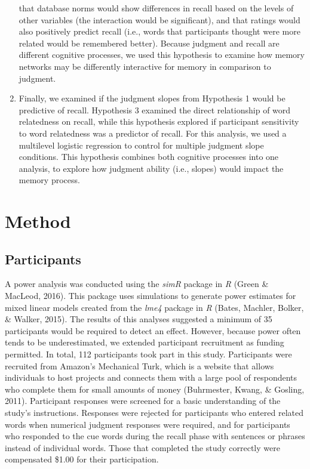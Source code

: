 \documentclass[english,man]{apa6}
\theoremstyle{definition}
\theoremstyle{definition}
\theoremstyle{definition}
\theoremstyle{remark}
\begin{document}
\begin{enumerate}
  that database norms would show differences in recall based on the
  levels of other variables (the interaction would be significant), and
  that ratings would also positively predict recall (i.e., words that
  participants thought were more related would be remembered better).
  Because judgment and recall are different cognitive processes, we used
  this hypothesis to examine how memory networks may be differently
  interactive for memory in comparison to judgment.
\item
  Finally, we examined if the judgment slopes from Hypothesis 1 would be
  predictive of recall. Hypothesis 3 examined the direct relationship of
  word relatedness on recall, while this hypothesis explored if
  participant sensitivity to word relatedness was a predictor of recall.
  For this analysis, we used a multilevel logistic regression to control
  for multiple judgment slope conditions. This hypothesis combines both
  cognitive processes into one analysis, to explore how judgment ability
  (i.e., slopes) would impact the memory process.
\end{enumerate}

\section{Method}\label{method}

\subsection{Participants}\label{participants}

A power analysis was conducted using the \emph{simR} package in \emph{R}
(Green \& MacLeod, 2016). This package uses simulations to generate
power estimates for mixed linear models created from the \emph{lme4}
package in \emph{R} (Bates, Machler, Bolker, \& Walker, 2015). The
results of this analyses suggested a minimum of 35 participants would be
required to detect an effect. However, because power often tends to be
underestimated, we extended participant recruitment as funding
permitted. In total, 112 participants took part in this study.
Participants were recruited from Amazon's Mechanical Turk, which is a
website that allows individuals to host projects and connects them with
a large pool of respondents who complete them for small amounts of money
(Buhrmester, Kwang, \& Gosling, 2011). Participant responses were
screened for a basic understanding of the study's instructions.
Responses were rejected for participants who entered related words when
numerical judgment responses were required, and for participants who
responded to the cue words during the recall phase with sentences or
phrases instead of individual words. Those that completed the study
correctly were compensated \$1.00 for their participation.
\end{document}
